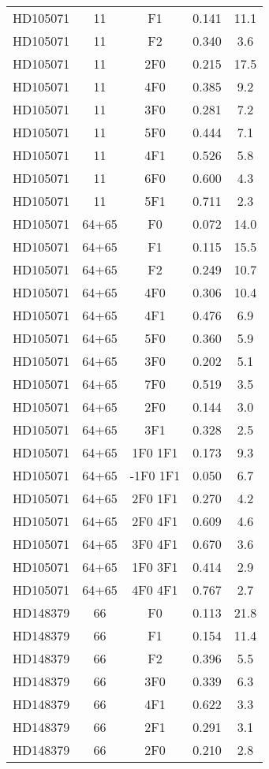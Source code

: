 \begin{table*}
\begin{tabular}{l c c c c}
HD105071 & 11 & F1 & 0.141 & 11.1\\ 
HD105071 & 11 & F2 & 0.340 & 3.6\\ 
HD105071 & 11 & 2F0 & 0.215 & 17.5\\ 
HD105071 & 11 & 4F0 & 0.385 & 9.2\\ 
HD105071 & 11 & 3F0 & 0.281 & 7.2\\ 
HD105071 & 11 & 5F0 & 0.444 & 7.1\\ 
HD105071 & 11 & 4F1 & 0.526 & 5.8\\ 
HD105071 & 11 & 6F0 & 0.600 & 4.3\\ 
HD105071 & 11 & 5F1 & 0.711 & 2.3\\ 
\hline
HD105071 & 64+65 & F0 & 0.072 & 14.0\\ 
HD105071 & 64+65 & F1 & 0.115 & 15.5\\ 
HD105071 & 64+65 & F2 & 0.249 & 10.7\\ 
HD105071 & 64+65 & 4F0 & 0.306 & 10.4\\ 
HD105071 & 64+65 & 4F1 & 0.476 & 6.9\\ 
HD105071 & 64+65 & 5F0 & 0.360 & 5.9\\ 
HD105071 & 64+65 & 3F0 & 0.202 & 5.1\\ 
HD105071 & 64+65 & 7F0 & 0.519 & 3.5\\ 
HD105071 & 64+65 & 2F0 & 0.144 & 3.0\\ 
HD105071 & 64+65 & 3F1 & 0.328 & 2.5\\ 
HD105071 & 64+65 & 1F0 1F1 & 0.173 & 9.3\\ 
HD105071 & 64+65 & -1F0 1F1 & 0.050 & 6.7\\ 
HD105071 & 64+65 & 2F0 1F1 & 0.270 & 4.2\\ 
HD105071 & 64+65 & 2F0 4F1 & 0.609 & 4.6\\ 
HD105071 & 64+65 & 3F0 4F1 & 0.670 & 3.6\\ 
HD105071 & 64+65 & 1F0 3F1 & 0.414 & 2.9\\ 
HD105071 & 64+65 & 4F0 4F1 & 0.767 & 2.7\\ 
\hline
HD148379 & 66 & F0 & 0.113 & 21.8\\ 
HD148379 & 66 & F1 & 0.154 & 11.4\\ 
HD148379 & 66 & F2 & 0.396 & 5.5\\ 
HD148379 & 66 & 3F0 & 0.339 & 6.3\\ 
HD148379 & 66 & 4F1 & 0.622 & 3.3\\ 
HD148379 & 66 & 2F1 & 0.291 & 3.1\\ 
HD148379 & 66 & 2F0 & 0.210 & 2.8\\ 

\end{tabular}
\end{table*}
